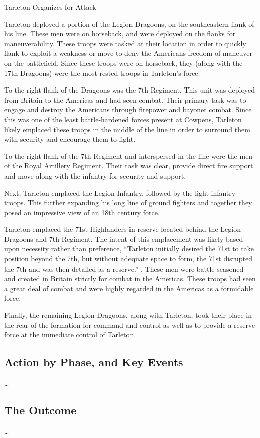 Tarleton Organizes for Attack

Tarleton deployed a portion of the Legion Dragoons, on the southeastern flank
of his line. These men were on horseback, and were deployed on the flanks for
maneuverability. These troops were tasked at their location in order to quickly
flank to exploit a weakness or move to deny the Americans freedom of maneuver
on the battlefield. Since these troops were on horseback, they (along with the
17th Dragoons) were the most rested troops in Tarleton's force.

To the right flank of the Dragoons was the 7th Regiment. This unit was deployed
from Britain to the Americas and had seen combat. Their primary task was to
engage and destroy the Americans through firepower and bayonet combat. Since
this was one of the least battle-hardened forces present at Cowpens, Tarleton
likely emplaced these troops in the middle of the line in order to surround
them with security and encourage them to fight.

To the right flank of the 7th Regiment and interspersed in the line were the
men of the Royal Artillery Regiment. Their task was clear, provide direct fire
support and move along with the infantry for security and support.

Next, Tarleton emplaced the Legion Infantry, followed by the light infantry
troops. This further expanding his long line of ground fighters and together
they posed an impressive view of an 18th century force.

Tarleton emplaced the 71st Highlanders in reserve located behind the Legion
Dragoons and 7th Regiment. The intent of this emplacement was likely based upon
necessity rather than preference, ``Tarleton initially desired the 71st to take
position beyond the 7th, but without adequate space to form, the 71st disrupted
the 7th and was then detailed as a reserve.'' \cite[84]{babits_devil_2001}. These men were
battle seasoned and created in Britain strictly for combat in the Americas.
These troops had seen a great deal of combat and were highly regarded in the
Americas as a formidable force.

Finally, the remaining Legion Dragoons, along with Tarleton, took their place
in the rear of the formation for command and control as well as to provide a
reserve force at the immediate control of Tarleton.

\subsection{Action by Phase, and Key Events}

\ldots

\subsection{The Outcome}

\ldots
